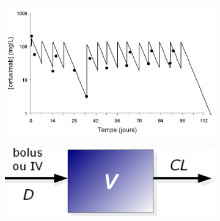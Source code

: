 \begin{figure}[htbp] 

  \begin{subfigure}[b]{0.75\linewidth}
    \centering
    \includegraphics[width=0.75\linewidth]{figures/raster/FIG_19a1} 
  \end{subfigure}%
  \begin{subfigure}[b]{0.25\linewidth}
    \centering
    \includegraphics[width=0.75\linewidth]{figures/raster/FIG_19a2} 
  \end{subfigure} 
  

\end{figure}
